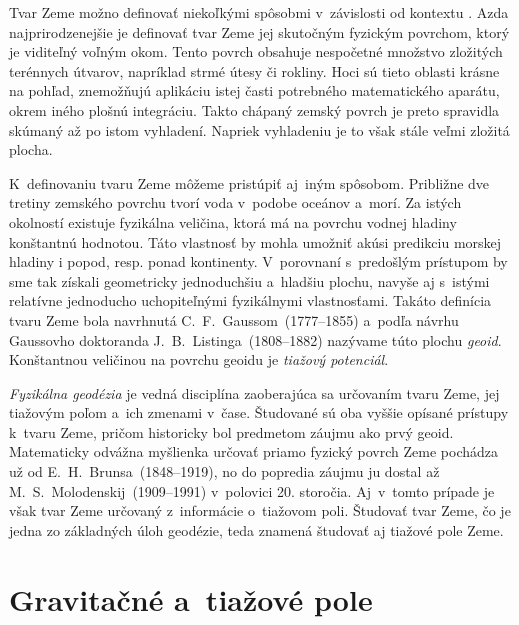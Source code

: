 \documentclass[a4paper,12pt]{book}
\begin{document}
Tvar Zeme možno definovať niekoľkými spôsobmi v~závislosti od kontextu 
\parencite{MoritzTheFigureOfTheEarth}.  Azda najprirodzenejšie je definovať 
tvar Zeme jej skutočným fyzickým povrchom, ktorý je viditeľný voľným okom.  
Tento povrch obsahuje nespočetné množstvo zložitých terénnych útvarov, 
napríklad strmé útesy či rokliny.  Hoci sú tieto oblasti krásne na pohľad, 
znemožňujú aplikáciu istej časti potrebného matematického aparátu, okrem iného 
plošnú integráciu.  Takto chápaný zemský povrch je preto spravidla skúmaný až 
po istom vyhladení.  Napriek vyhladeniu je to však stále veľmi zložitá plocha.

K~definovaniu tvaru Zeme môžeme pristúpiť aj~iným spôsobom.  Približne dve 
tretiny zemského povrchu tvorí voda v~podobe oceánov a~morí.  Za istých 
okolností existuje fyzikálna veličina, ktorá má na povrchu vodnej hladiny 
konštantnú hodnotou.  Táto vlastnosť by mohla umožniť akúsi predikciu morskej 
hladiny i popod, resp. ponad kontinenty.  V~porovnaní s~predošlým prístupom by 
sme tak získali geometricky jednoduchšiu a~hladšiu plochu, navyše aj s~istými 
relatívne jednoducho uchopiteľnými fyzikálnymi vlastnosťami.  Takáto definícia 
tvaru Zeme bola navrhnutá C.~F.~Gaussom~(1777--1855) a~podľa návrhu Gaussovho 
doktoranda J.~B.~Listinga~(1808--1882) nazývame túto plochu \emph{geoid}.  
Konštantnou veličinou na povrchu geoidu je \emph{tiažový potenciál}.

\emph{Fyzikálna geodézia} je vedná disciplína zaoberajúca sa určovaním tvaru 
Zeme, jej tiažovým poľom a~ich zmenami v~čase.  Študované sú oba vyššie opísané 
prístupy k~tvaru Zeme, pričom historicky bol predmetom záujmu ako prvý geoid.  
Matematicky odvážna myšlienka určovať priamo fyzický povrch Zeme pochádza už od 
E.~H.~Brunsa~(1848--1919), no do popredia záujmu ju dostal až 
M.~S.~Molodenskij~(1909--1991) v~polovici 20. storočia.  Aj~v~tomto prípade je 
však tvar Zeme určovaný z~informácie o~tiažovom poli.  Študovať tvar Zeme, čo 
je jedna zo základných úloh geodézie, teda znamená študovať aj tiažové pole 
Zeme.







\chapter{Gravitačné a~tiažové pole}
\label{sec:gravitational_and_gravity_field}
\end{document}
